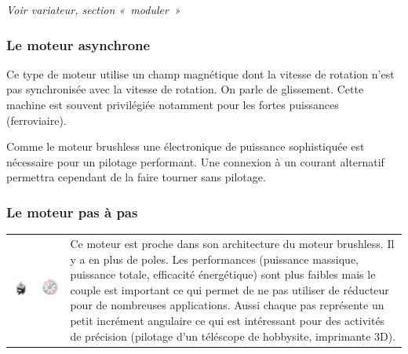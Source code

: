 \emph{Voir variateur, section «~moduler~»} \\

\subsubsection{Le moteur asynchrone}

Ce type de moteur utilise un champ magnétique dont la vitesse de
rotation n'est pas synchronisée avec la vitesse de rotation. On parle de
glissement. Cette machine est souvent privilégiée notamment pour les
fortes puissances (ferroviaire).

Comme le moteur brushless une électronique de puissance sophistiquée est
nécessaire pour un pilotage performant. Une connexion à un courant
alternatif permettra cependant de la faire tourner sans pilotage.

\subsubsection{Le moteur pas à pas}

\begin{tabular}{ccm{.33\linewidth}}

\includegraphics[width=2.0855in]{media/image72.png} &
\includegraphics[width=1.875in]{media/image73.png} & Ce
moteur est proche dans son architecture du moteur brushless. Il y a en
plus de poles. Les performances (puissance massique, puissance totale,
efficacité énergétique) sont plus faibles mais le couple est important
ce qui permet de ne pas utiliser de réducteur pour de nombreuses
applications. Aussi chaque pas représente un petit incrément angulaire
ce qui est intéressant pour des activités de précision (pilotage d'un
téléscope de hobbysite, imprimante 3D). \\
\end{tabular}


